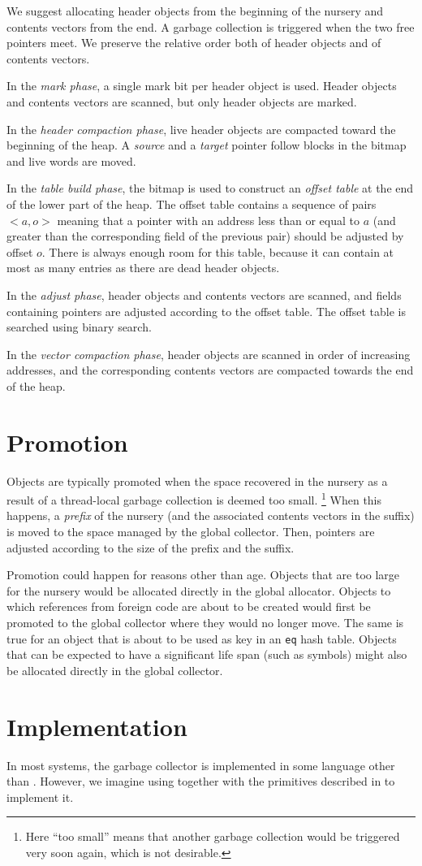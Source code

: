 We suggest allocating header objects from the beginning of the nursery
and contents vectors from the end.  A garbage collection is triggered
when the two free pointers meet.  We preserve the relative order both
of header objects and of contents vectors. 

In the \emph{mark phase}, a single mark bit per header object is
used.  Header objects and contents vectors are scanned, but only
header objects are marked.  

In the \emph{header compaction phase}, live header objects are compacted
toward the beginning of the heap.  A \emph{source} and a \emph{target}
pointer follow blocks in the bitmap and live words are moved. 

In the \emph{table build phase}, the bitmap is used to construct an
\emph{offset table} at the end of the lower part of the heap.  The
offset table contains a sequence of pairs $<a,o>$ meaning that a
pointer with an address less than or equal to $a$ (and greater than
the corresponding field of the previous pair) should be adjusted by
offset $o$.  There is always enough room for this table, because it
can contain at most as many entries as there are dead header objects.  

In the \emph{adjust phase}, header objects and contents vectors are
scanned, and fields containing pointers are adjusted according to the
offset table.  The offset table is searched using binary search. 

In the \emph{vector compaction phase}, header objects are scanned in
order of increasing addresses, and the corresponding contents vectors
are compacted towards the end of the heap.

\section{Promotion}

Objects are typically promoted when the space recovered in the nursery
as a result of a thread-local garbage collection is deemed too small.%
\footnote{Here ``too small'' means that another garbage collection
  would be triggered very soon again, which is not desirable.}  When
this happens, a \emph{prefix} of the nursery (and the associated
contents vectors in the suffix) is moved to the space managed by the
global collector.  Then, pointers are adjusted according to the size
of the prefix and the suffix. 

Promotion could happen for reasons other than age.  Objects that are
too large for the nursery would be allocated directly in the global
allocator.  Objects to which references from foreign code are
about to be created would first be promoted to the global collector
where they would no longer move.  The same is true for an object that
is about to be used as key in an \texttt{eq} hash table.  Objects that
can be expected to have a significant life span (such as symbols)
might also be allocated directly in the global collector. 

\section{Implementation}

In most systems, the garbage collector is implemented in some language
other than \cl{}.  However, we imagine using \cl{} together with the
primitives described in  to
implement it.

